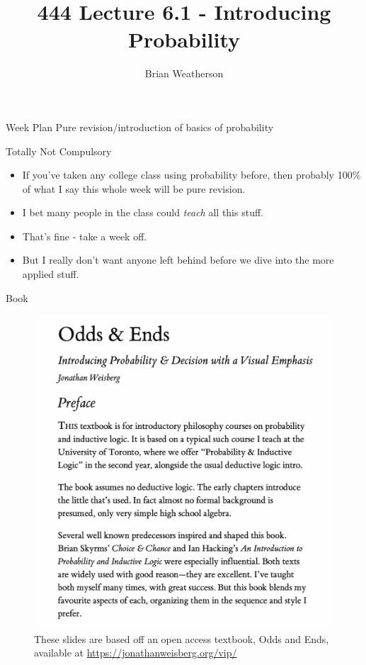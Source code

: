 \documentclass[
  ignorenonframetext,
]{beamer}
\title{444 Lecture 6.1 - Introducing Probability}
\author{Brian Weatherson}
\date{}
\providecommand{\tightlist}{%
  \setlength{\itemsep}{0pt}\setlength{\parskip}{0pt}}
\begin{document}
\frame{\titlepage}

\begin{frame}{Week Plan}
\protect\hypertarget{week-plan}{}
Pure revision/introduction of basics of probability
\end{frame}

\begin{frame}{Totally Not Compulsory}
\protect\hypertarget{totally-not-compulsory}{}
\begin{itemize}
\tightlist
\item
  If you've taken any college class using probability before, then
  probably 100\% of what I say this whole week will be pure revision.
\item
  I bet many people in the class could \emph{teach} all this stuff.
\item
  That's fine - take a week off.
\item
  But I really don't want anyone left behind before we dive into the
  more applied stuff.
\end{itemize}
\end{frame}

\begin{frame}{Book}
\protect\hypertarget{book}{}
\begin{figure}
\centering
\includegraphics[width=\textwidth,height=0.7\textheight]{1_1_Odds_and_Ends.png}
\caption{These slides are based off an open access textbook, Odds and
Ends, available at \url{https://jonathanweisberg.org/vip/}}
\end{figure}
\end{frame}
\end{document}
